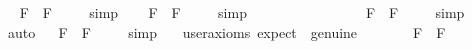\begin{isabellebody}
{\isafoldproof}%
%
\isadelimproof
%
\endisadelimproof
\isanewline
\ \isamarkupfalse%
\ {\isachardoublequoteopen}{\isacharbrackleft}\isactrlbold {\isasymdiamond}{\isasymphi}\isactrlsup F\ \isactrlbold {\isasymrightarrow}\ \isactrlbold {\isasymbox}\isactrlbold {\isasymdiamond}{\isasymphi}\isactrlsup F{\isacharbrackright}\ {\isacharequal}\ {\isasymtop}{\isachardoublequoteclose}%
\isadelimproof
\ %
\endisadelimproof
%
\isatagproof
{}\isamarkupfalse%
\ simp\ \isamarkupfalse%
%
\endisatagproof
{\isafoldproof}%
%
\isadelimproof
%
\endisadelimproof
\isanewline
\ \isamarkupfalse%
\ {\isachardoublequoteopen}{\isacharbrackleft}\isactrlbold {\isasymbox}\isactrlbold {\isasymdiamond}{\isasymphi}\isactrlsup F\ \isactrlbold {\isasymrightarrow}\ \isactrlbold {\isasymdiamond}{\isasymphi}\isactrlsup F{\isacharbrackright}\ {\isacharequal}\ {\isasymtop}{\isachardoublequoteclose}%
\isadelimproof
\ %
\endisadelimproof
%
\isatagproof
{}\isamarkupfalse%
\ simp\ \isamarkupfalse%
\ \ \ \ \ \ \ \ \ \ \ \ %
%
\endisatagproof
{\isafoldproof}%
%
\isadelimproof
%
\endisadelimproof
\isanewline
\ \isamarkupfalse%
\ {\isachardoublequoteopen}{\isacharbrackleft}\isactrlbold {\isasymdiamond}\isactrlbold {\isasymbox}{\isasymphi}\isactrlsup F\ \isactrlbold {\isasymrightarrow}\ \isactrlbold {\isasymdiamond}{\isasymphi}\isactrlsup F{\isacharbrackright}\ {\isacharequal}\ {\isasymtop}{\isachardoublequoteclose}%
\isadelimproof
\ %
\endisadelimproof
%
\isatagproof
{}\isamarkupfalse%
\ simp\ \isamarkupfalse%
\ auto%
\endisatagproof
{\isafoldproof}%
%
\isadelimproof
%
\endisadelimproof
\isanewline
\ \isamarkupfalse%
\ {\isachardoublequoteopen}{\isacharbrackleft}\isactrlbold {\isasymbox}\isactrlbold {\isasymdiamond}{\isasymphi}\isactrlsup F\ \isactrlbold {\isasymrightarrow}\ \isactrlbold {\isasymbox}{\isasymphi}\isactrlsup F{\isacharbrackright}\ {\isacharequal}\ {\isasymtop}{\isachardoublequoteclose}%
\isadelimproof
\ %
\endisadelimproof
%
\isatagproof
{}\isamarkupfalse%
\ simp\ \isamarkupfalse%
\ \ {\isacharbrackleft}user{\isacharunderscore}axioms{\isacharcomma}\ expect\ {\isacharequal}\ genuine{\isacharbrackright}\ \isamarkupfalse%
\ \ \ %
%
\endisatagproof
{\isafoldproof}%
%
\isadelimproof
%
\endisadelimproof
\isanewline
\ \isamarkupfalse%
\ {\isachardoublequoteopen}{\isacharbrackleft}\isactrlbold {\isasymdiamond}\isactrlbold {\isasymbox}{\isasymphi}\isactrlsup F\ \isactrlbold {\isasymrightarrow}\ \isactrlbold {\isasymbox}{\isasymphi}\isactrlsup F{\isacharbrackright}\ {\isacharequal}\ {\isasymtop}{\isachardoublequoteclose}%

\end{isabellebody}
